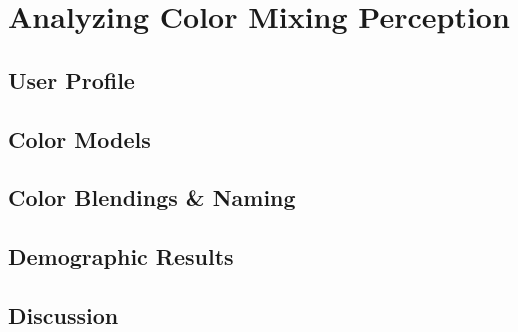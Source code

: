 
\section{Analyzing Color Mixing Perception}
\label{sec:results}

\subsection{User Profile}

\subsection{Color Models}

\subsection{Color Blendings \& Naming}

\subsection{Demographic Results}

\subsection{Discussion}

